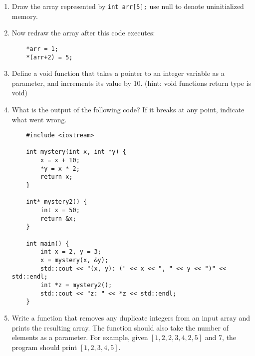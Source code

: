 \documentclass[11pt]{article}
\begin{document}
\begin{enumerate}[leftmargin=*]
\item Draw the array represented by \verb|int arr[5];| use null to denote uninitialized memory.

\item Now redraw the array after this code executes:
\begin{verbatim}
    *arr = 1;
    *(arr+2) = 5;
\end{verbatim}

\item Define a void function that takes a pointer to an integer variable as a parameter, and increments its value by 10. (hint: void functions return type is void)

\item What is the output of the following code? If it breaks at any point, indicate what went wrong.
\begin{verbatim}
    #include <iostream>

    int mystery(int x, int *y) {
        x = x + 10;
        *y = x * 2;
        return x;
    }

    int* mystery2() {
        int x = 50;
        return &x;
    }

    int main() {
        int x = 2, y = 3;
        x = mystery(x, &y);
        std::cout << "(x, y): (" << x << ", " << y << ")" << std::endl;
        int *z = mystery2();
        std::cout << "z: " << *z << std::endl;
    }
\end{verbatim}

\item Write a function that removes any duplicate integers from an input array and prints the resulting array. The function should also take the number of elements as a parameter. For example, given $[1, 2, 2, 3, 4, 2, 5]$ and $7$, the program should print $[1, 2, 3, 4, 5]$.

\end{enumerate}

\label{r:lastpage}
\end{document}
